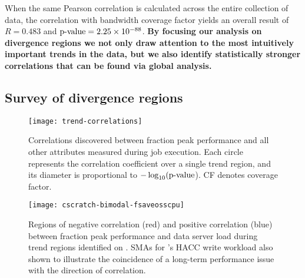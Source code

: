 When the same Pearson correlation is calculated across the entire collection
of \mira \mirafsone data, the correlation with bandwidth coverage factor
yields an overall result of $R = 0.483$ and $\textup{p-value} =
2.25\times 10^{-88}$.  \textbf{By focusing our analysis on divergence regions we not only
draw attention to the most intuitively important trends in the data, but we
also identify statistically stronger correlations that can be found via
global analysis.}

\subsection{Survey of divergence regions} \label{sec:results/correlate-all}




\begin{figure}
    \centering
    \texttt{[image: trend-correlations]}
    \vspace{-.35in}
    \caption{Correlations discovered between fraction peak performance and all other attributes measured during job execution.
    Each circle represents the correlation coefficient over a single trend region, and its diameter is proportional to $-\log_{10}(\textup{p-value}$).
    CF denotes coverage factor.}
    \label{fig:trend-correlations}
\end{figure}


\begin{figure}
    \centering
    \texttt{[image: cscratch-bimodal-fsaveosscpu]}
    \vspace{-.35in}
    \caption{Regions of negative correlation (red) and positive correlation (blue) between fraction peak performance and data server load during trend regions identified on \cori.
    SMAs for \cori's HACC write workload also shown to illustrate the coincidence of a long-term performance issue with the direction of correlation.}
    \label{fig:cscratch-bimodal-fsaveosscpu}
\end{figure}

